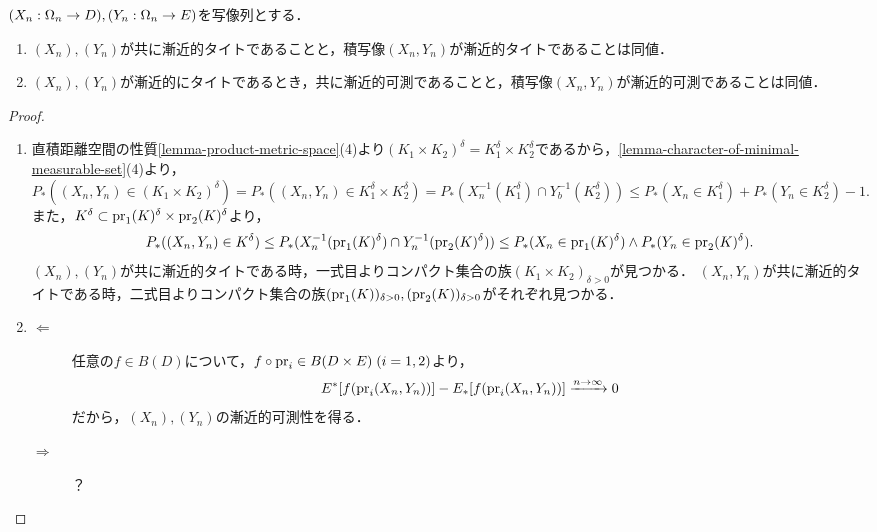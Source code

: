 \documentclass[uplatex,dvipdfmx]{jsreport}
\begin{document}
\begin{lemma}[結合写像の漸近的タイト性]\label{lemma-asymptotical-character-of-product-sequence}
    $(X_n:\Omega_n\to D),(Y_n:\Omega_n\to E)$を写像列とする．
    \begin{enumerate}
        \item $(X_n),(Y_n)$が共に漸近的タイトであることと，積写像$(X_n,Y_n)$が漸近的タイトであることは同値．
        \item $(X_n),(Y_n)$が漸近的にタイトであるとき，共に漸近的可測であることと，積写像$(X_n,Y_n)$が漸近的可測であることは同値．
    \end{enumerate}
\end{lemma}
\begin{proof}\mbox{}
    \begin{enumerate}
        \item 直積距離空間の性質\ref{lemma-product-metric-space}(4)より$(K_1\times K_2)^\delta=K_1^\delta\times K_2^\delta$であるから，\ref{lemma-character-of-minimal-measurable-set}(4)より，
        \[P_*((X_n,Y_n)\in(K_1\times K_2)^\delta)=P_*((X_n,Y_n)\in K_1^\delta\times K_2^\delta)=P_*(X_n^{-1}(K_1^\delta)\cap Y_b^{-1}(K_2^\delta))\le P_*(X_n\in K_1^\delta)+P_*(Y_n\in K_2^\delta)-1.\]
        また，$K^\delta\subset\mathrm{pr}_1(K)^\delta\times\mathrm{pr}_2(K)^\delta$より，
        \[P_*((X_n,Y_n)\in K^\delta)\le P_*(X^{-1}_n(\mathrm{pr}_1(K)^\delta)\cap Y^{-1}_n(\mathrm{pr}_2(K)^\delta))\le P_*(X_n\in\mathrm{pr}_1(K)^\delta)\land P_*(Y_n\in\mathrm{pr}_2(K)^\delta).\]
        $(X_n),(Y_n)$が共に漸近的タイトである時，一式目よりコンパクト集合の族$(K_1\times K_2)_{\delta>0}$が見つかる．
        $(X_n,Y_n)$が共に漸近的タイトである時，二式目よりコンパクト集合の族$(\mathrm{pr}_1(K))_{\delta>0},(\mathrm{pr}_2(K))_{\delta>0}$がそれぞれ見つかる．
        \item 
        \begin{description}
            \item[$\Leftarrow$] 
            任意の$f\in B(D)$について，$f\circ\mathrm{pr}_i\in B(D\times E)\;(i=1,2)$より，
            \[E^*[f(\mathrm{pr}_i(X_n,Y_n))]-E_*[f(\mathrm{pr}_i(X_n,Y_n))]\xrightarrow{n\to\infty}0\]
            だから，$(X_n),(Y_n)$の漸近的可測性を得る．
            \item[$\Rightarrow$] ？
        \end{description}
    \end{enumerate}
\end{proof}
\end{document}
